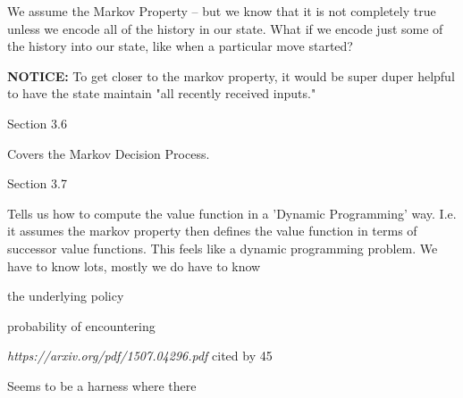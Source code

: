 We assume the Markov Property -- but we know that it is not completely true unless we encode all of the history in our state.
What if we encode just some of the history into our state, like when a particular move started?

\textbf{NOTICE:}
To get closer to the markov property, it would be super duper helpful to have the state maintain "all recently received inputs."

Section 3.6

Covers the Markov Decision Process.

Section 3.7

Tells us how to compute the value function in a 'Dynamic Programming' way.
I.e. it assumes the markov property then defines the value function in terms of successor value functions.
This feels like a dynamic programming problem.
We have to know lots, mostly we do have to know 
\item the underlying policy
\item probability of encountering


\textit{https://arxiv.org/pdf/1507.04296.pdf}
cited by 45

Seems to be a harness where there 
